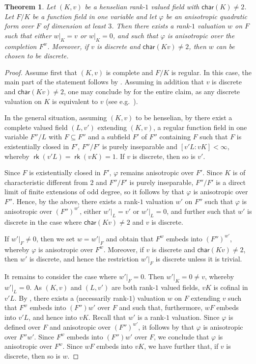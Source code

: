 \documentclass[12pt,leqno]{amsart}
\DeclareMathOperator{\rk}{\mathsf{rk}}
\newcommand{\car}{\mathsf{char}}
\newcommand{\vf}{\varphi}
\numberwithin{equation}{section}
\newtheorem{thm}[equation]{Theorem}
\theoremstyle{definition}
\theoremstyle{plain}
\begin{document}
\begin{thm}\label{T:Mehmeti}
Let $(K,v)$ be a henselian rank-$1$ valued field with $\car(K)\neq 2$. 
Let $F/K$ be a function field in one variable and let $\vf$ be an anisotropic quadratic form over $F$ of dimension at least $3$.
Then there exists a rank-$1$ valuation $w$ on $F$ such that either $w|_K=v$ or $w|_K=0$, 
and such that $\vf$ is anisotropic over the completion $F^w$. 
Moreover, if $v$ is discrete and $\car(Kv)\neq 2$, then $w$ can be chosen to be discrete.
\end{thm}
\begin{proof}
Assume first that $(K,v)$ is complete and $F/K$ is regular.
In this case, the main part of the statement follows by \cite[Cor.~3.19 \& Rem.~3.20]{Meh19}.
Assuming in addition that $v$ is discrete and $\car(Kv)\neq 2$, one may conclude by \cite[Theorem 3.1]{CTPS12} for the entire claim, as any discrete valuation on $K$ is equivalent to $v$ (see e.g.~\cite[Prop.~2.2]{BGVG14}).

In the general situation, assuming $(K,v)$ to be henselian, by  there exist a complete valued field $(L, v')$ extending $(K, v)$, a regular function field in one variable $F''/L$ with $F \subseteq F''$ and a subfield $F'$ of $F''$ containing $F$ such that $F$ is existentially closed in $F'$, $F''/F'$ is purely inseparable and $[v'L : vK] < \infty$, whereby $\rk(v'L)=\rk(vK)=1$.
If $v$ is discrete, then so is $v'$.

Since $F$ is existentially closed in $F'$, $\vf$ remains anisotropic over $F'$.
Since $K$ is of characteristic different from $2$ and $F''/F'$ is purely inseparable, $F''/F'$ is a direct limit of finite extensions of odd degree, so it follows by \cite[Chap.~VII, Theorem 2.7]{Lam05} that
$\vf$ is anisotropic over $F''$.
Hence, by the above, there exists a rank-$1$ valuation $w'$ on $F''$ such that $\vf$ is anisotropic over $(F'')^{w'}$, either $w'|_{L}=v'$ or $w'|_L=0$, and further such that $w'$ is discrete in the case where $\car(Kv)\neq 2$ and $v$ is discrete.

If $w'\vert_F \neq 0$, then we set $w = w'\vert_F$ and obtain that $F^w$ embeds into $(F'')^{w'}$, whereby $\varphi$ is anisotropic over $F^w$.
Moreover, if $v$ is discrete and $\car(Kv)\neq 2$, then $w'$ is discrete, and hence the restriction $w'|_F$ is discrete unless it is trivial. 

It remains to consider the case where $w'\vert_F = 0$. Then $w'|_K=0\neq v$, whereby $w'|_L=0$.
As $(K, v)$ and $(L, v')$ are both rank-$1$ valued fields, $vK$ is cofinal in $v'L$.
By , there exists a (necessarily rank-$1$) valuation $w$ on $F$ extending $v$ such that $F^w$ embeds into $(F'')w'$ over $F$ and such that, furthermore, $wF$ embeds into $v'L$, and hence into $vK$.
Recall that $w'$ is a rank-$1$ valuation.
Since $\varphi$ is defined over $F$ and anisotropic over $(F'')^{w'}$, it follows by  \cite[Theorem 7]{Dur48} that $\varphi$ is anisotropic over $F''w'$. 
Since $F^w$ embeds into $(F'')w'$ over $F$, we conclude that $\varphi$ is anisotropic over $F^w$.
Since $wF$ embeds into $vK$, we have further that, if $v$ is discrete, then so is $w$.
\end{proof}
\end{document}
